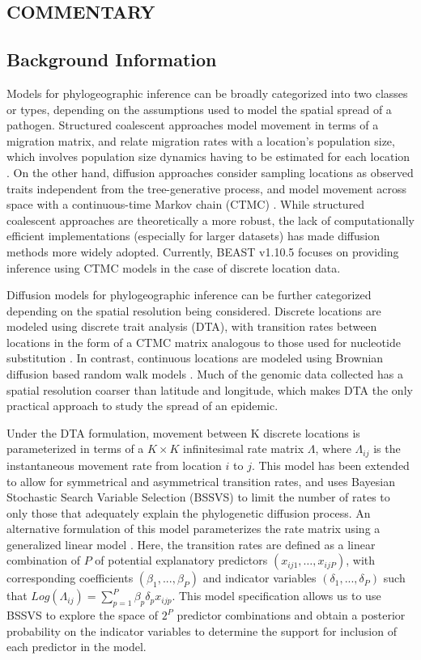 \documentclass{article}
\begin{document}
\begin{multicols}{2}

\section*{COMMENTARY}
\subsection*{Background Information}

Models for phylogeographic inference can be broadly categorized into two classes or types, depending on the assumptions used to model the spatial spread of a pathogen.
Structured coalescent approaches model movement in terms of a migration matrix, and relate migration rates with a location's population size, which involves population size dynamics having to be estimated for each location \cite{basta,mascot}.
On the other hand, diffusion approaches consider sampling locations as observed traits independent from the tree-generative process, and model movement across space with a continuous-time Markov chain (CTMC) \cite{dta,rw}. 
While structured coalescent approaches are theoretically a more robust, the lack of computationally efficient implementations (especially for larger datasets) has made diffusion methods more widely adopted.
Currently, BEAST v1.10.5 focuses on providing inference using CTMC models in the case of discrete location data.

Diffusion models for phylogeographic inference can be further categorized depending on the spatial resolution being considered.
Discrete locations are modeled using discrete trait analysis (DTA), with transition rates between locations in the form of a CTMC matrix analogous to those used for nucleotide substitution \cite{dta}.
In contrast, continuous locations are modeled using Brownian diffusion based random walk models \cite{rw}.
Much of the genomic data collected has a spatial resolution coarser than latitude and longitude, which makes DTA the only practical approach to study the spread of an epidemic. 

Under the DTA formulation, movement between K discrete locations is parameterized in terms of a $K \times K$ infinitesimal rate matrix $\Lambda$, where $\Lambda_{ij}$ is the instantaneous movement rate from location $i$ to $j$. This model has been extended to allow for symmetrical and asymmetrical transition rates, and uses Bayesian Stochastic Search Variable Selection (BSSVS) to limit the number of rates to only those that adequately explain the phylogenetic diffusion process. An alternative formulation of this model parameterizes the rate matrix using a generalized linear model \cite{glm}. Here, the transition rates are defined as a linear combination of $P$ of potential explanatory predictors $(x_{ij1}, \dots, x_{ijP})$, with corresponding coefficients $(\beta_1, ..., \beta_P )$ and indicator variables $(\delta_1, ..., \delta_P )$ such that $Log(\Lambda_{ij}) = \sum_{p=1}^P \beta_p \delta_p x_{ijp}$. This model specification allows us to use BSSVS to explore the space of $2^P$ predictor combinations and obtain a posterior probability on the indicator variables to determine the support for inclusion of each predictor in the model.


\end{multicols}
\end{document}
